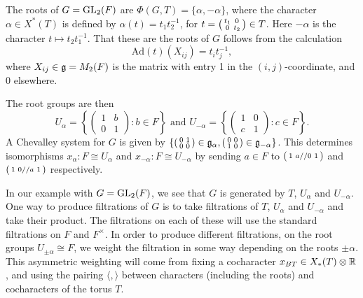 \begin{example}
    The roots of $G=\mathrm{GL}_2(F)$ are $\Phi(G,T) = \{\alpha,-\alpha\}$, where the character $\alpha \in X^*(T)$ is defined by $\alpha(t) = t_1t_2^{-1}$, for $t=\begin{psmallmatrix}
        t_1 & 0 \\0&t_2
    \end{psmallmatrix} \in T$. Here $-\alpha$ is the character $t \mapsto t_2t_1^{-1}$. That these are the roots of $G$ follows from the calculation 
    $$\mathrm{Ad}(t)(X_{ij}) = t_it_j^{-1},$$
    where $X_{ij} \in \mathfrak{g} = M_2(F)$ is the matrix with entry 1 in the $(i,j)$-coordinate, and 0 elsewhere.

    The root groups are then 
    $$U_\alpha = \left\{\begin{pmatrix}
        1&b\\0&1
    \end{pmatrix} : b \in F\right\} \text{ and } U_{-\alpha} = \left\{\begin{pmatrix}
        1&0\\c&1
    \end{pmatrix} : c \in F\right\}.$$
    A Chevalley system for $G$ is given by $\left\{\begin{psmallmatrix}
        0&1\\0&0
    \end{psmallmatrix} \in \mathfrak{g}_\alpha, \begin{psmallmatrix}
        0&0\\1&0
    \end{psmallmatrix} \in \mathfrak{g}_{-\alpha}\right\}$. This determines isomorphisms $x_\alpha: F \cong U_\alpha$ and $x_{-\alpha}: F \cong U_{-\alpha}$ by sending $a \in F$ to $\begin{psmallmatrix}
        1&a//0&1
    \end{psmallmatrix}$ and $\begin{psmallmatrix}
        1&0//a&1
    \end{psmallmatrix}$ respectively.
\end{example}

In our example with $G=\mathrm{GL}_2(F)$, we see that $G$ is generated by $T$, $U_\alpha$ and $U_{-\alpha}$. One way to produce filtrations of $G$ is to take filtrations of $T$, $U_{\alpha}$ and $U_{-\alpha}$ and take their product. The filtrations on each of these will use the standard filtrations on $F$ and $F^\times$. In order to produce different filtrations, on the root groups $U_{\pm \alpha} \cong F$, we weight the filtration in some way depending on the roots $\pm \alpha$. This asymmetric weighting will come from fixing a cocharacter $x_{BT} \in X_*(T) \otimes \mathbb{R}$, and using the pairing $\langle, \rangle$ between characters (including the roots) and cocharacters of the torus $T$.

